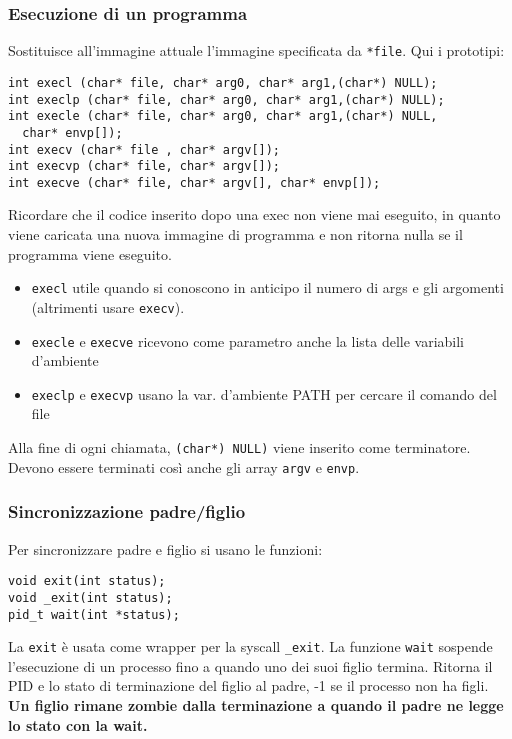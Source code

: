 \documentclass[a4paper]{article}
\begin{document}
\subsubsection{Esecuzione di un programma}
Sostituisce all'immagine attuale l'immagine specificata da \verb|*file|. Qui i prototipi:
\begin{verbatim}
int execl (char* file, char* arg0, char* arg1,(char*) NULL);
int execlp (char* file, char* arg0, char* arg1,(char*) NULL);
int execle (char* file, char* arg0, char* arg1,(char*) NULL, 
  char* envp[]);
int execv (char* file , char* argv[]);
int execvp (char* file, char* argv[]);
int execve (char* file, char* argv[], char* envp[]);
\end{verbatim}
Ricordare che il codice inserito dopo una exec non viene mai eseguito, in quanto viene caricata una nuova immagine di programma e non ritorna nulla se il programma viene eseguito.
\begin{itemize}
\item \verb|execl| utile quando si conoscono in anticipo il numero di args e gli argomenti (altrimenti usare \verb|execv|).
\item \verb|execle| e \verb|execve| ricevono come parametro anche la lista delle variabili d'ambiente
\item \verb|execlp| e \verb|execvp| usano la var. d'ambiente PATH  per cercare il comando del file
\end{itemize}
Alla fine di ogni chiamata, \verb|(char*) NULL)| viene inserito come terminatore. Devono essere terminati così anche gli array \verb|argv| e \verb|envp|.

\subsubsection{Sincronizzazione padre/figlio}
Per sincronizzare padre e figlio si usano le funzioni:
\begin{verbatim}
void exit(int status);
void _exit(int status);
pid_t wait(int *status);
\end{verbatim}

La \verb|exit| è usata come wrapper per la syscall \verb|_exit|.
La funzione \verb|wait| sospende l'esecuzione di un processo fino a quando uno dei suoi figlio termina. Ritorna il PID e lo stato di terminazione del figlio al padre, -1 se il processo non ha figli. \\

\textbf{Un figlio rimane zombie dalla terminazione a quando il padre ne legge lo stato con la wait.} \\
\end{document}
